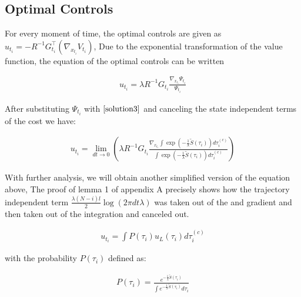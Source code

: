 \documentclass[journal]{IEEEtran}
\begin{document}
\subsection{Optimal Controls}

For every moment of time, the optimal controls are given as $u_{t_i} = -R^{-1} G_{t_i}^{\top} (\nabla_{x_{t_i}}V_{t_i})$, Due to the
exponential transformation of the value function, the equation of the optimal controls can be written 


\begin{equation}
  \begin{aligned}
   u_{t_i} = \lambda R^{-1} G_{t_i} \frac{\nabla_{x_{t_i}}\Psi_{t_i}}{\Psi_{t_i}}  \nonumber
  \end{aligned}
\end{equation}


After substituting $\Psi_{t_i}$ with $\ref{solution3}$ and canceling the state independent terms of the cost we have:


\begin{equation}
  \begin{aligned}
   u_{t_i} = \lim_{dt \to 0 } (\lambda R^{-1} G_{t_i} \frac{\nabla_{x_{t_i}}\int \exp(-\frac{1}{\lambda}\tilde{S}(\tau_i)) d\tau_i^{(c)} }{\int \exp(-\frac{1}{\lambda}\tilde{S}(\tau_i)) d\tau_i^{(c)} } ) \nonumber
  \end{aligned}
\end{equation}

With further analysis, we will obtain another simplified version of the equation above, The proof of lemma 1 of appendix A precisely shows how the trajectory independent term
$\frac{\lambda (N-i)l}{2} \log (2\pi dt \lambda)$ was taken out of the and gradient and then taken out of the integration and canceled out.


\begin{equation}
  \begin{aligned}
   u_{t_i} = \int P(\tau_i) u_L(\tau_i) d\tau_i^{(c)}  
  \end{aligned}
\end{equation}

with the probability $P(\tau_i)$ defined as:

\begin{equation}
  \begin{aligned}
   P(\tau_i) = \frac{e^{-\frac{1}{\lambda}\tilde{S}(\tau_i)}  }{\int e^{-\frac{1}{\lambda}\tilde{S}(\tau_i)}d\tau_i}
  \end{aligned}
\end{equation}
\end{document}
